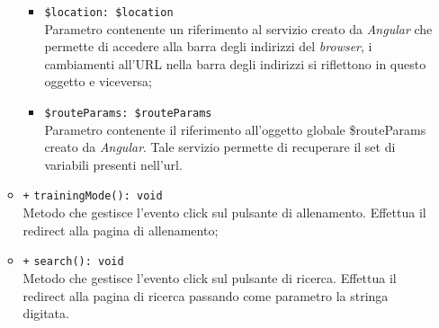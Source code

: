 \begin{itemize}
\begin{itemize}
\begin{itemize}
			\item \texttt{\$location: \$location} \\
			Parametro contenente un riferimento al servizio creato da \textit{Angular} che permette di accedere alla barra degli indirizzi del \textit{browser}, i cambiamenti all'URL nella barra degli indirizzi si riflettono in questo oggetto e viceversa;
			\item \texttt{\$routeParams: \$routeParams} \\
			Parametro contenente il riferimento all'oggetto globale \$routeParams creato da \textit{Angular}. Tale servizio permette di recuperare il set di variabili presenti nell'url.
		\end{itemize}
		\item \texttt{+} \texttt{trainingMode(): void} \\
		Metodo che gestisce l’evento click sul pulsante di allenamento. Effettua il redirect alla pagina di allenamento;
		\item \texttt{+} \texttt{search(): void} \\
		Metodo che gestisce l’evento click sul pulsante di ricerca. Effettua il redirect alla pagina di ricerca passando come parametro la stringa digitata.
	\end{itemize}
\end{itemize}

